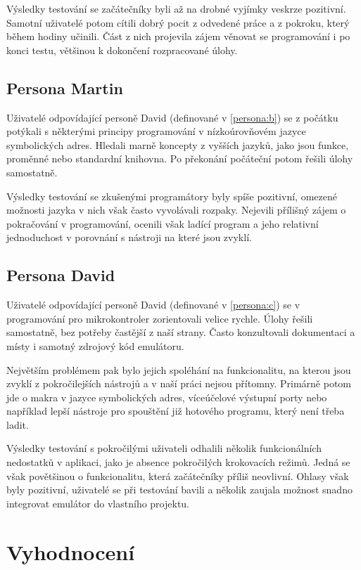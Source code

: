 Výsledky testování se začátečníky byli až na drobné vyjímky veskrze pozitivní. Samotní uživatelé potom cítili dobrý pocit z odvedené práce a z pokroku, který během hodiny učinili. Část z nich projevila zájem věnovat se programování i po konci testu, většinou k dokončení rozpracované úlohy.

\subsection{Persona Martin}

Uživatelé odpovídající personě David (definované v \ref{persona:b}) se z počátku potýkali s některými principy programování v nízkoúrovňovém jazyce symbolických adres. Hledali marně koncepty z vyšších jazyků, jako jsou funkce, proměnné nebo standardní knihovna. Po překonání počáteční  potom řešili úlohy samostatně.

Výsledky testování se zkušenými programátory byly spíše pozitivní, omezené možnosti jazyka v nich však často vyvolávali rozpaky. Nejevili přílišný zájem o pokračování v programování, ocenili však ladící program a jeho relativní jednoduchost v porovnání s nástroji na které jsou zvyklí.

\subsection{Persona David}

Uživatelé odpovídající personě David (definované v \ref{persona:c}) se v programování pro mikrokontroler zorientovali velice rychle. Úlohy řešili samostatně, bez potřeby častější z naší strany. Často konzultovali dokumentaci a místy i samotný zdrojový kód emulátoru.

Největším problémem pak bylo jejich spoléhání na funkcionalitu, na kterou jsou zvyklí z pokročilejších nástrojů a v naší práci nejsou přítomny. Primárně potom jde o makra v jazyce symbolických adres, víceúčelové výstupní porty nebo například lepší nástroje pro spouštění již hotového programu, který není třeba ladit.

Výsledky testování s pokročilými uživateli odhalili několik funkcionálních nedostatků v aplikaci, jako je absence pokročilých krokovacích režimů. Jedná se však povětšinou o funkcionalitu, která začátečníky příliš neovlivní. Ohlasy však byly pozitivní, uživatelé se při testování bavili a několik zaujala možnost snadno integrovat emulátor do vlastního projektu.

\section{Vyhodnocení}

